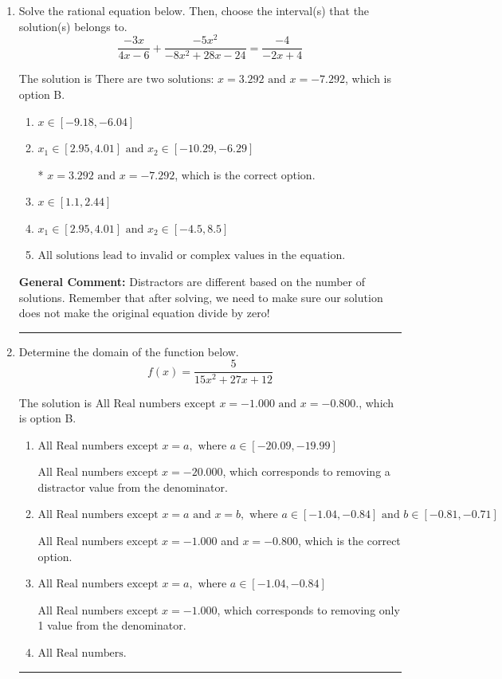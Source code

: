 \documentclass{extbook}[14pt]
\newcommand{\litem}[1]{\item #1

\rule{\textwidth}{0.4pt}}
\begin{document}
\begin{enumerate}\litem{
Solve the rational equation below. Then, choose the interval(s) that the solution(s) belongs to.
\[ \frac{-3x}{4x -6} + \frac{-5x^{2}}{-8x^{2} +28 x -24} = \frac{-4}{-2x + 4} \]

The solution is \( \text{There are two solutions: } x = 3.292 \text{ and } x = -7.292 \), which is option B.\begin{enumerate}[label=\Alph*.]
\item \( x \in [-9.18,-6.04] \)


\item \( x_1 \in [2.95, 4.01] \text{ and } x_2 \in [-10.29,-6.29] \)

* $x = 3.292 \text{ and } x = -7.292$, which is the correct option.
\item \( x \in [1.1,2.44] \)


\item \( x_1 \in [2.95, 4.01] \text{ and } x_2 \in [-4.5,8.5] \)


\item \( \text{All solutions lead to invalid or complex values in the equation.} \)


\end{enumerate}

\textbf{General Comment:} Distractors are different based on the number of solutions. Remember that after solving, we need to make sure our solution does not make the original equation divide by zero!
}
\litem{
Determine the domain of the function below.
\[ f(x) = \frac{5}{15x^{2} +27 x + 12} \]

The solution is \( \text{All Real numbers except } x = -1.000 \text{ and } x = -0.800. \), which is option B.\begin{enumerate}[label=\Alph*.]
\item \( \text{All Real numbers except } x = a, \text{ where } a \in [-20.09, -19.99] \)

All Real numbers except $x = -20.000$, which corresponds to removing a distractor value from the denominator.
\item \( \text{All Real numbers except } x = a \text{ and } x = b, \text{ where } a \in [-1.04, -0.84] \text{ and } b \in [-0.81, -0.71] \)

All Real numbers except $x = -1.000$ and $x = -0.800$, which is the correct option.
\item \( \text{All Real numbers except } x = a, \text{ where } a \in [-1.04, -0.84] \)

All Real numbers except $x = -1.000$, which corresponds to removing only 1 value from the denominator.
\item \( \text{All Real numbers.} \)


\end{enumerate}}
\end{enumerate}
\end{document}
